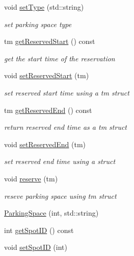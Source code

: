 \begin{DoxyCompactItemize}
void \mbox{\hyperlink{class_parking_space_a4abd727d17e2045ef0617fb68e8135ed}{set\+Type}} (std\+::string)
\begin{DoxyCompactList}\small\item\em set parking space type \end{DoxyCompactList}\item 
tm \mbox{\hyperlink{class_parking_space_a83b660966c8ed21827b961d4e084c183}{get\+Reserved\+Start}} () const
\begin{DoxyCompactList}\small\item\em get the start time of the reservation \end{DoxyCompactList}\item 
void \mbox{\hyperlink{class_parking_space_a6a764047ce175633cc5288cede8eba90}{set\+Reserved\+Start}} (tm)
\begin{DoxyCompactList}\small\item\em set reserved start time using a tm struct \end{DoxyCompactList}\item 
tm \mbox{\hyperlink{class_parking_space_a9048ab587b0287dabfa0f8cc202e8bb5}{get\+Reserved\+End}} () const
\begin{DoxyCompactList}\small\item\em return reserved end time as a tm struct \end{DoxyCompactList}\item 
void \mbox{\hyperlink{class_parking_space_aac425aba68f7d46d178fb5c33ea0367a}{set\+Reserved\+End}} (tm)
\begin{DoxyCompactList}\small\item\em set reserved end time using a struct \end{DoxyCompactList}\item 
void \mbox{\hyperlink{class_parking_space_a22e2c189a28f4b56cb73ba807811e6ad}{reserve}} (tm)
\begin{DoxyCompactList}\small\item\em reseve parking space using tm struct \end{DoxyCompactList}\item 
\mbox{\hyperlink{class_parking_space_a4d9ade29bc807ca0e60ee8b1d4f24745}{Parking\+Space}} (int, std\+::string)
\item 
int \mbox{\hyperlink{class_parking_space_a8f250e7f0d01332b36c117b7c9ee0982}{get\+Spot\+ID}} () const
\item 
void \mbox{\hyperlink{class_parking_space_a9acf2d76a9b9f84d049b44dd0d4a5c8b}{set\+Spot\+ID}} (int)
\item 

\end{DoxyCompactItemize}
